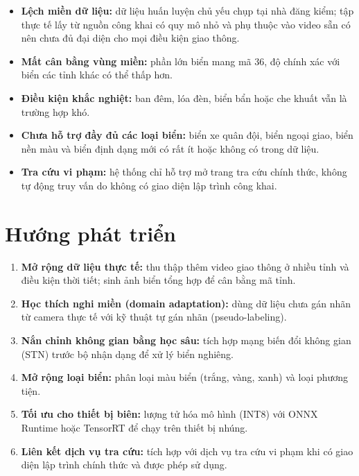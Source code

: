 \begin{itemize}
  \item \textbf{Lệch miền dữ liệu:} dữ liệu huấn luyện chủ yếu chụp tại nhà đăng kiểm; tập thực tế lấy từ nguồn công khai có quy mô nhỏ và phụ thuộc vào video sẵn có nên chưa đủ đại diện cho mọi điều kiện giao thông.
  \item \textbf{Mất cân bằng vùng miền:} phần lớn biển mang mã 36, độ chính xác với biển các tỉnh khác có thể thấp hơn.
  \item \textbf{Điều kiện khắc nghiệt:} ban đêm, lóa đèn, biển bẩn hoặc che khuất vẫn là trường hợp khó.
  \item \textbf{Chưa hỗ trợ đầy đủ các loại biển:} biển xe quân đội, biển ngoại giao, biển nền màu và biển định dạng mới có rất ít hoặc không có trong dữ liệu.
  \item \textbf{Tra cứu vi phạm:} hệ thống chỉ hỗ trợ mở trang tra cứu chính thức, không tự động truy vấn do không có giao diện lập trình công khai.
\end{itemize}

\section{Hướng phát triển}

\begin{enumerate}
  \item \textbf{Mở rộng dữ liệu thực tế:} thu thập thêm video giao thông ở nhiều tỉnh và điều kiện thời tiết; sinh ảnh biển tổng hợp để cân bằng mã tỉnh.
  \item \textbf{Học thích nghi miền (domain adaptation):} dùng dữ liệu chưa gán nhãn từ camera thực tế với kỹ thuật tự gán nhãn (pseudo-labeling).
  \item \textbf{Nắn chỉnh không gian bằng học sâu:} tích hợp mạng biến đổi không gian (STN) trước bộ nhận dạng để xử lý biển nghiêng.
  \item \textbf{Mở rộng loại biển:} phân loại màu biển (trắng, vàng, xanh) và loại phương tiện.
  \item \textbf{Tối ưu cho thiết bị biên:} lượng tử hóa mô hình (INT8) với ONNX Runtime hoặc TensorRT để chạy trên thiết bị nhúng.
  \item \textbf{Liên kết dịch vụ tra cứu:} tích hợp với dịch vụ tra cứu vi phạm khi có giao diện lập trình chính thức và được phép sử dụng.
\end{enumerate}
